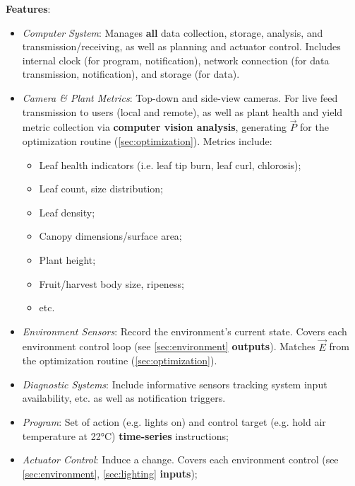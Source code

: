 \textbf{Features}:
\begin{itemize}
    \item \textit{Computer System}: Manages \textbf{all} data collection, storage, analysis, and transmission/receiving, as well as planning and actuator control. Includes internal clock (for program, notification), network connection (for data transmission, notification), and storage (for data). 
    \item \textit{Camera \& Plant Metrics}: Top-down and side-view cameras. For live feed transmission to users (local and remote), as well as plant health and yield metric collection via \textbf{computer vision analysis}, generating $\vec P$ for the optimization routine (\ref{sec:optimization}). Metrics include:
    \begin{itemize}
        \item Leaf health indicators (i.e. leaf tip burn, leaf curl, chlorosis);
        \item Leaf count, size distribution;
        \item Leaf density;
        \item Canopy dimensions/surface area;
        \item Plant height;
        \item Fruit/harvest body size, ripeness;
        \item etc.
    \end{itemize}
    \item \textit{Environment Sensors}: Record the environment's current state. Covers each environment control loop (see \ref{sec:environment} \textbf{outputs}). Matches $\vec E$ from the optimization routine (\ref{sec:optimization}).
\newpage
    \item \textit{Diagnostic Systems}: Include informative sensors tracking system input availability, etc. as well as notification triggers.
    \item \textit{Program}: Set of action (e.g. lights on) and control target (e.g. hold air temperature at 22°C) \textbf{time-series} instructions;
    \item \textit{Actuator Control}: Induce a change. Covers each environment control (see \ref{sec:environment}, \ref{sec:lighting} \textbf{inputs});
\end{itemize}